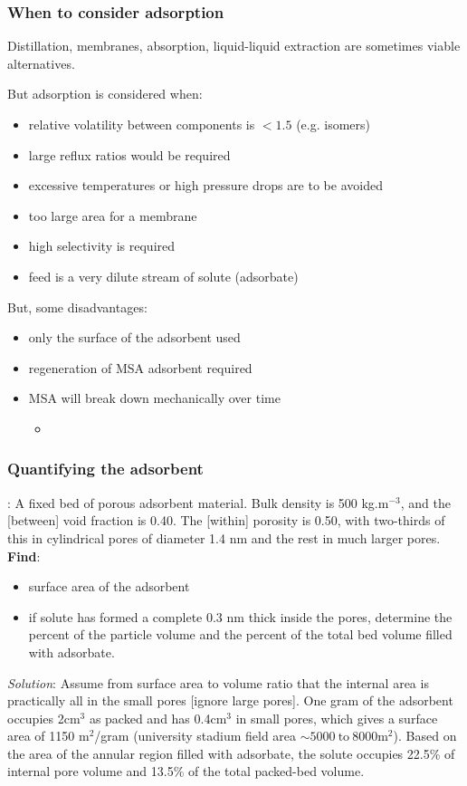 \begin{frame}\frametitle{When to consider adsorption}
	Distillation, membranes, absorption, liquid-liquid extraction are sometimes viable alternatives.

	\vspace{12pt}
	But adsorption is considered when:
	\begin{itemize}
		\item	relative volatility between components is $<1.5$ (e.g. isomers)
		\item	large reflux ratios would be required
		\item	excessive temperatures or high pressure drops are to be avoided
		\item	too large area for a membrane
		\item	high selectivity is required
		\item	feed is a very dilute stream of solute (adsorbate)
	\end{itemize}
	But, some disadvantages:
	\begin{itemize}
		\item	only the surface of the adsorbent used
		\item	regeneration of MSA adsorbent required
		\item	MSA will break down mechanically over time
		\begin{itemize}
			\item	{\color{myOrange}{we can pump it, filter it, and/or put it through cyclones}}
		\end{itemize}
	\end{itemize}
\end{frame}

\begin{frame}\frametitle{Quantifying the adsorbent}
	: A fixed bed of porous adsorbent material. Bulk density is 500 kg.m$^{-3}$, and the {\color{purple}{interparticle}} [between] void fraction is 0.40. The {\color{purple}{intraparticle}} [within] porosity is 0.50, with two-thirds of this in cylindrical pores of diameter 1.4 nm and the rest in much larger pores. \textbf{Find}:
	\begin{itemize}
		\item	surface area of the adsorbent
		\item	if solute has formed a complete {\color{purple}{monomolecular layer}} 0.3 nm thick inside the pores, determine the percent of the particle volume and the percent of the total bed volume filled with adsorbate.
	\end{itemize}

	\vspace{12pt}
	\emph{Solution}:
	Assume from surface area to volume ratio that the internal area is practically all in the small pores [ignore large pores].
	One gram of the adsorbent occupies 2cm$^3$ as packed and has 0.4cm$^3$ in small pores, which gives a surface area of 1150 m$^2$/gram {\scriptsize (university stadium field area $\sim 5000~\text{to}~8000 \text{m}^2$)}.
	Based on the area of the annular region filled with adsorbate, the solute occupies 22.5\% of internal pore volume and 13.5\% of the total packed-bed volume.
\end{frame}

